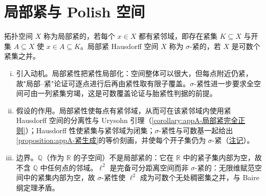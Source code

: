 \documentclass[../main.tex]{subfiles}
\begin{document}
\section{局部紧与 Polish 空间}\label{section:appA-局部紧Polish}\label{section:appA-Polish}

\begin{definition}\label{definition:appA-局部紧}
拓扑空间 $X$ 称为局部紧的，若每个 $x\in X$ 都有紧邻域，即存在紧集 $K\subseteq X$ 与开集 $A\subseteq X$ 使 $x\in A\subseteq K$。局部紧 Hausdorff 空间 $X$ 称为 $\sigma$-紧的，若 $X$ 是可数个紧集之并。
\end{definition}

\begin{remark}\label{remark:appA-局部紧}
\begin{enumerate}[(i)]
\item 引入动机。局部紧性把紧性局部化：空间整体可以很大，但每点附近仍紧，故"局部--紧"论证可逐点进行后再由紧性取有限子覆盖。$\sigma$-紧性进一步要求全空间可由一列紧集穷竭，这是可数覆盖论证与胎紧性判据的前提。
\item 假设的作用。局部紧性使每点有紧邻域，从而可在该紧邻域内使用紧 Hausdorff 空间的分离性与 Urysohn 引理（\cref{corollary:appA-局部紧完全正则}）；Hausdorff 性使紧集与紧邻域为闭集；$\sigma$-紧性与可数基一起给出\cref{proposition:appA-紧生成}的等价刻画，并使每个开子集仍为 $\sigma$-紧（\hyperref[remark:appA-可数基局部紧]{注记}）。
\item 边界。$\mathbb{Q}$（作为 $\mathbb{R}$ 的子空间）不是局部紧的：它在 $\mathbb{R}$ 中的紧子集内部为空，故不含 $\mathbb{Q}$ 中任何点的邻域。$\ell^2$ 是完备可分距离空间而非 $\sigma$-紧的：无限维赋范空间中的紧集内部为空，故 $\sigma$-紧性使 $\ell^2$ 成为可数个无处稠密集之并，与 Baire 纲定理矛盾。
\end{enumerate}
\end{remark}
\end{document}
